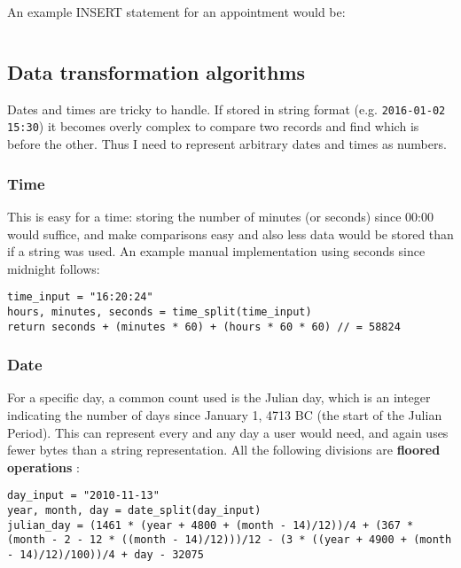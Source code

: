 An example INSERT statement for an appointment would be:

\begin{verbatim}
\end{verbatim}



\subsection{Data transformation algorithms}

Dates and times are tricky to handle. If stored in string format (e.g.
\texttt{2016-01-02 15:30}) it becomes overly complex to compare two records and
find which is before the other. Thus I need to represent arbitrary dates and
times as numbers.


\subsubsection{Time}

This is easy for a time: storing the number of minutes (or seconds) since 00:00
would suffice, and make comparisons easy and also less data would be stored than
if a string was used. An example manual implementation using seconds
since midnight follows:

\begin{verbatim}
time_input = "16:20:24"
hours, minutes, seconds = time_split(time_input)
return seconds + (minutes * 60) + (hours * 60 * 60) // = 58824
\end{verbatim}


\subsubsection{Date}

For a specific day, a common count used is the Julian day, which is an integer
indicating the number of days since January 1, 4713 BC (the start of the Julian
Period). This can represent every and any day a user would need, and again uses
fewer bytes than a string representation. All the following divisions are
\textbf{floored operations} \cite{wiki-julian}:

\begin{verbatim}
day_input = "2010-11-13"
year, month, day = date_split(day_input)
julian_day = (1461 * (year + 4800 + (month - 14)/12))/4 + (367 * (month - 2 - 12 * ((month - 14)/12)))/12 - (3 * ((year + 4900 + (month - 14)/12)/100))/4 + day - 32075
\end{verbatim}


